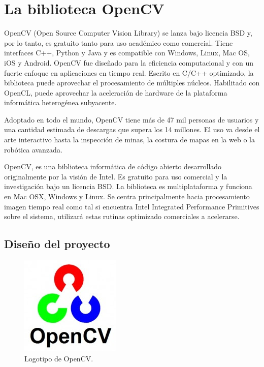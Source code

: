 \chapter{La biblioteca OpenCV}

OpenCV (Open Source Computer Vision Library) se lanza bajo licencia BSD y, por lo tanto, es gratuito tanto para uso académico como comercial. Tiene interfaces C++, Python y Java y es compatible con Windows, Linux, Mac OS, iOS y Android. OpenCV fue diseñado para la eficiencia computacional y con un fuerte enfoque en aplicaciones en tiempo real. Escrito en C/C++ optimizado, la biblioteca puede aprovechar el procesamiento de múltiples núcleos. Habilitado con OpenCL, puede aprovechar la aceleración de hardware de la plataforma informática heterogénea subyacente.

Adoptado en todo el mundo, OpenCV tiene más de 47 mil personas de usuarios y una cantidad estimada de descargas que supera los 14 millones. El uso va desde el arte interactivo hasta la inspección de minas, la costura de mapas en la web o la robótica avanzada. \cite{OpenCVWebSite}

OpenCV, es una biblioteca informática de código abierto desarrollado originalmente por la visión de Intel. Es gratuito para uso comercial y la investigación bajo un licencia BSD. La biblioteca es multiplataforma y funciona en Mac OSX, Windows y Linux. Se centra principalmente hacia procesamiento imagen tiempo real como tal si encuentra Intel Integrated Performance Primitives sobre el sistema, utilizará estas rutinas optimizado comerciales a acelerarse.

\section{Diseño del proyecto}

\begin{figure}[h!]
  	\centering
	\includegraphics[scale=1]{FotosPaginasWebHeliostatos/unnamed(9).jpg}
	\caption{Logotipo de OpenCV.
	\label{fig:FotosPaginasWebHeliostatos/unnamed(9).jpg}}
\end{figure}

